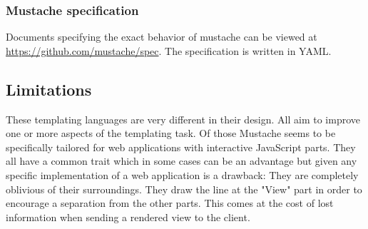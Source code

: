 \subsubsection{Mustache specification}
Documents specifying the exact behavior of mustache can be viewed at
\url{https://github.com/mustache/spec}. The specification is written in YAML.

\subsection{Limitations}
These templating languages are very different in their design.
All aim to improve one or more aspects of the templating task.
Of those Mustache seems to be specifically tailored for web applications
with interactive JavaScript parts.
They all have a common trait which in some cases can be an advantage
but given any specific implementation of a web application is a drawback:
They are completely oblivious of their surroundings. They draw the line
at the "View" part in order to encourage a separation from the other
parts. This comes at the cost of lost information when sending a
rendered view to the client.
